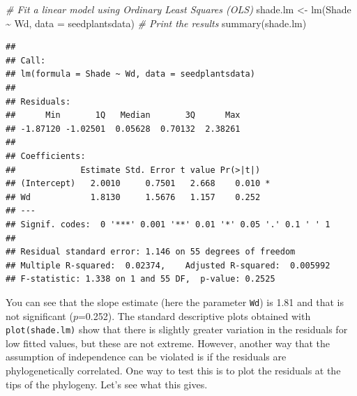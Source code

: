 \documentclass[
]{book}
\newenvironment{Shaded}{\begin{snugshade}}{\end{snugshade}}
\newcommand{\AttributeTok}[1]{\textcolor[rgb]{0.77,0.63,0.00}{#1}}
\newcommand{\CommentTok}[1]{\textcolor[rgb]{0.56,0.35,0.01}{\textit{#1}}}
\newcommand{\FunctionTok}[1]{\textcolor[rgb]{0.00,0.00,0.00}{#1}}
\newcommand{\NormalTok}[1]{#1}
\newcommand{\OtherTok}[1]{\textcolor[rgb]{0.56,0.35,0.01}{#1}}
\newcommand{\SpecialCharTok}[1]{\textcolor[rgb]{0.00,0.00,0.00}{#1}}
\begin{document}
\begin{Shaded}
\begin{Highlighting}[]
\CommentTok{\# Fit a linear model using Ordinary Least Squares (OLS)}
\NormalTok{shade.lm }\OtherTok{\textless{}{-}} \FunctionTok{lm}\NormalTok{(Shade }\SpecialCharTok{\textasciitilde{}}\NormalTok{ Wd, }\AttributeTok{data =}\NormalTok{ seedplantsdata)}
\CommentTok{\# Print the results}
\FunctionTok{summary}\NormalTok{(shade.lm)}
\end{Highlighting}
\end{Shaded}

\begin{verbatim}
## 
## Call:
## lm(formula = Shade ~ Wd, data = seedplantsdata)
## 
## Residuals:
##      Min       1Q   Median       3Q      Max 
## -1.87120 -1.02501  0.05628  0.70132  2.38261 
## 
## Coefficients:
##             Estimate Std. Error t value Pr(>|t|)  
## (Intercept)   2.0010     0.7501   2.668    0.010 *
## Wd            1.8130     1.5676   1.157    0.252  
## ---
## Signif. codes:  0 '***' 0.001 '**' 0.01 '*' 0.05 '.' 0.1 ' ' 1
## 
## Residual standard error: 1.146 on 55 degrees of freedom
## Multiple R-squared:  0.02374,    Adjusted R-squared:  0.005992 
## F-statistic: 1.338 on 1 and 55 DF,  p-value: 0.2525
\end{verbatim}

You can see that the slope estimate (here the parameter \texttt{Wd}) is 1.81 and that is not significant (\(p\)=0.252). The standard descriptive plots obtained with \texttt{plot(shade.lm)} show that there is slightly greater variation in the residuals for low fitted values, but these are not extreme. However, another way that the assumption of independence can be violated is if the residuals are phylogenetically correlated. One way to test this is to plot the residuals at the tips of the phylogeny. Let's see what this gives.
\end{document}

